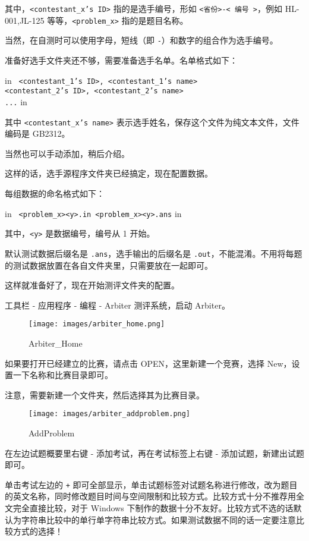 其中，\texttt{<contestant_x's ID>} 指的是选手编号，形如 \texttt{<省份>-< 编号 >}，例如 HL-001,JL-125 等等，\texttt{<problem_x>} 指的是题目名称。

当然，在自测时可以使用字母，短线（即 \texttt{-}）和数字的组合作为选手编号。

准备好选手文件夹还不够，需要准备选手名单。名单格式如下：

 in
\texttt{
<contestant_1's ID>, <contestant_1's name>\\<contestant_2's ID>, <contestant_2's name>\\...}
 in

其中 \texttt{<contestant_x's name>} 表示选手姓名，保存这个文件为纯文本文件，文件编码是 GB2312。

当然也可以手动添加，稍后介绍。

这样的话，选手源程序文件夹已经搞定，现在配置数据。

每组数据的命名格式如下：

 in
\texttt{
<problem_x><y>.in <problem_x><y>.ans}
 in

其中，\texttt{<y>} 是数据编号，编号从 1 开始。

默认测试数据后缀名是 \texttt{.ans}，选手输出的后缀名是 \texttt{.out}，不能混淆。不用将每题的测试数据放置在各自文件夹里，只需要放在一起即可。

这样就准备好了，现在开始测评文件夹的配置。

工具栏 - 应用程序 - 编程 - Arbiter 测评系统，启动 Arbiter。

\begin{figure}[h]
\centering
\texttt{[image: images/arbiter\_home.png]} 
\caption{Arbiter_Home}
\end{figure}

如果要打开已经建立的比赛，请点击 OPEN，这里新建一个竞赛，选择 New，设置一下名称和比赛目录即可。

注意，需要新建一个文件夹，然后选择其为比赛目录。

\begin{figure}[h]
\centering
\texttt{[image: images/arbiter\_addproblem.png]} 
\caption{AddProblem}
\end{figure}

在左边试题概要里右键 - 添加考试，再在考试标签上右键 - 添加试题，新建出试题即可。

单击考试左边的 \texttt{+} 即可全部显示，单击试题标签对试题名称进行修改，改为题目的英文名称，同时修改题目时间与空间限制和比较方式。比较方式十分不推荐用全文完全直接比较，对于 Windows 下制作的数据十分不友好。比较方式不选的话默认为字符串比较中的单行单字符串比较方式。如果测试数据不同的话一定要注意比较方式的选择！

